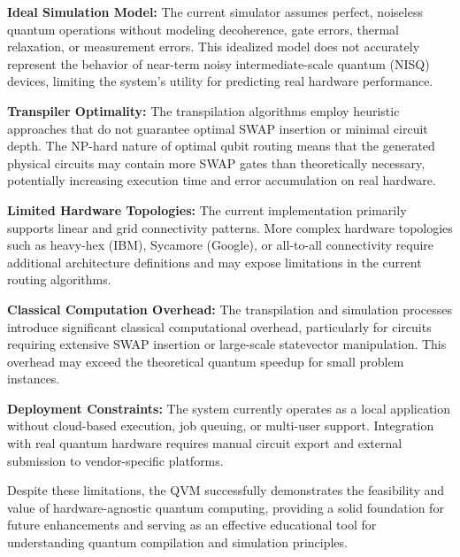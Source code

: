\textbf{Ideal Simulation Model:} The current simulator assumes perfect, noiseless quantum operations without modeling decoherence, gate errors, thermal relaxation, or measurement errors. This idealized model does not accurately represent the behavior of near-term noisy intermediate-scale quantum (NISQ) devices, limiting the system's utility for predicting real hardware performance.

\textbf{Transpiler Optimality:} The transpilation algorithms employ heuristic approaches that do not guarantee optimal SWAP insertion or minimal circuit depth. The NP-hard nature of optimal qubit routing means that the generated physical circuits may contain more SWAP gates than theoretically necessary, potentially increasing execution time and error accumulation on real hardware.

\textbf{Limited Hardware Topologies:} The current implementation primarily supports linear and grid connectivity patterns. More complex hardware topologies such as heavy-hex (IBM), Sycamore (Google), or all-to-all connectivity require additional architecture definitions and may expose limitations in the current routing algorithms.

\textbf{Classical Computation Overhead:} The transpilation and simulation processes introduce significant classical computational overhead, particularly for circuits requiring extensive SWAP insertion or large-scale statevector manipulation. This overhead may exceed the theoretical quantum speedup for small problem instances.

\textbf{Deployment Constraints:} The system currently operates as a local application without cloud-based execution, job queuing, or multi-user support. Integration with real quantum hardware requires manual circuit export and external submission to vendor-specific platforms.

Despite these limitations, the QVM successfully demonstrates the feasibility and value of hardware-agnostic quantum computing, providing a solid foundation for future enhancements and serving as an effective educational tool for understanding quantum compilation and simulation principles.

